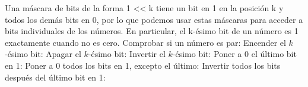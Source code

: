 {}\markdownRendererSectionBegin
{}\markdownRendererInterblockSeparator
{}\markdownRendererInterblockSeparator
{}
\markdownRendererSectionEnd \markdownRendererSectionBegin
{}\markdownRendererInterblockSeparator
{}\markdownRendererInterblockSeparator
{}
\markdownRendererSectionEnd \markdownRendererSectionBegin
{}\markdownRendererInterblockSeparator
{}Una máscara de bits de la forma 1 << k tiene un bit en 1 en la posición k y todos los demás bits en 0, por lo que podemos usar estas máscaras para acceder a bits individuales de los números. En particular, el k-ésimo bit de un número es 1 exactamente cuando  no es cero.\markdownRendererInterblockSeparator
{}\markdownRendererInterblockSeparator
{}\markdownRendererSectionBegin
{}\markdownRendererInterblockSeparator
{}\markdownRendererParagraphSeparator
{}
\markdownRendererSectionEnd 
\markdownRendererSectionEnd \markdownRendererSectionBegin
{}\markdownRendererParagraphSeparator
{}\markdownRendererUlBegin
\markdownRendererUlItem Comprobar si un número es par: \markdownRendererUlItemEnd 
\markdownRendererUlItem Encender el $k$-ésimo bit: \markdownRendererUlItemEnd 
\markdownRendererUlItem Apagar el $k$-ésimo bit: \markdownRendererUlItemEnd 
\markdownRendererUlItem Invertir el $k$-ésimo bit: \markdownRendererUlItemEnd 
\markdownRendererUlItem Poner a 0 el último bit en 1: \markdownRendererUlItemEnd 
\markdownRendererUlItem Poner a 0 todos los bits en 1, excepto el último: \markdownRendererUlItemEnd 
\markdownRendererUlItem Invertir todos los bits después del último bit en 1: \markdownRendererUlItemEnd 

